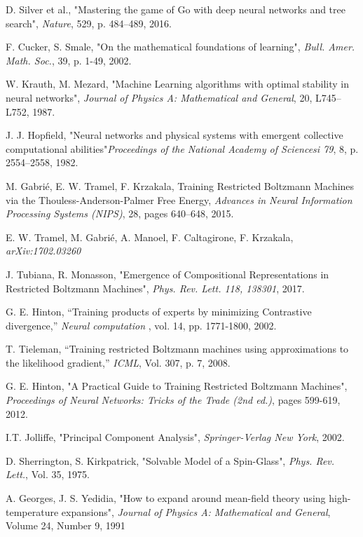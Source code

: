 \begin{thebibliography}{9}

D. Silver et al., "Mastering the game of Go with deep neural networks and tree search",
\textit{Nature}, 529, p. 484–489, 2016.

F. Cucker, S. Smale, "On the mathematical foundations of learning",
\textit{Bull. Amer. Math. Soc.}, 39, p. 1-49, 2002.

W. Krauth, M. Mezard, "Machine Learning algorithms with optimal stability in neural networks",
\textit{Journal of Physics A: Mathematical and General}, 20, L745–L752, 1987.

J. J. Hopfield, "Neural networks and physical systems with emergent collective computational abilities"\textit{Proceedings of the National Academy of Sciencesi 79}, 8, p. 2554–2558, 1982.

M. Gabri\'e, E. W. Tramel, F. Krzakala,
Training Restricted Boltzmann Machines via the Thouless-Anderson-Palmer Free Energy,
\textit{Advances in Neural Information Processing Systems (NIPS)}, 28, pages 640--648, 2015.

E. W. Tramel, M. Gabri\'e, A. Manoel, F. Caltagirone, F. Krzakala, \textit{arXiv:1702.03260}

J. Tubiana, R. Monasson, "Emergence of Compositional Representations in Restricted Boltzmann Machines",
\textit{Phys. Rev. Lett. 118, 138301}, 2017.

G. E. Hinton, “Training products of experts by minimizing Contrastive divergence,”
\textit{Neural computation}
, vol. 14, pp. 1771-1800, 2002.

T. Tieleman, “Training restricted Boltzmann machines using approximations to the likelihood gradient,”
\textit{ICML}, Vol. 307, p. 7, 2008.

G. E. Hinton, "A Practical Guide to Training Restricted Boltzmann Machines", \textit{Proceedings of Neural Networks: Tricks of the Trade (2nd ed.)}, pages 599-619, 2012. 

I.T. Jolliffe, "Principal Component Analysis",
\textit{Springer-Verlag New York}, 2002.

D. Sherrington, S. Kirkpatrick,
"Solvable Model of a Spin-Glass",
\textit{Phys. Rev. Lett.}, Vol. 35, 1975.

A. Georges, J. S. Yedidia,
"How to expand around mean-field theory using high-temperature expansions",
\textit{Journal of Physics A: Mathematical and General}, Volume 24, Number 9, 1991


\end{thebibliography}
